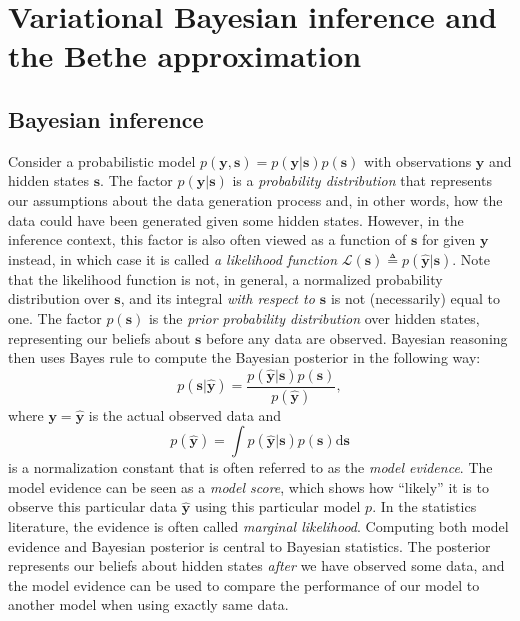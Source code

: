 \section{Variational Bayesian inference and the Bethe approximation}\label{chapter-02:section:bethe-free-energy}

\subsection{Bayesian inference}

Consider a probabilistic model $p(\bm{y}, \bm{s}) =
  p(\bm{y}\vert\bm{s})p(\bm{s})$ with observations $\bm{y}$ and hidden states $\bm{s}$.
The factor $p(\bm{y}\vert\bm{s})$ is a \textit{probability distribution} that represents our assumptions about 
the data generation process and, in other words, how the data could have been generated given some hidden states. However, in the inference context, this factor is also often viewed as a function of $\bm{s}$ for given $\bm{y}$ instead, in which case it is called \textit{a likelihood function} $\mathcal{L}(\bm{s}) \triangleq p(\hat{\bm{y}}|\bm{s})$. 
Note that the likelihood function is not, in general, a normalized probability distribution over $\bm{s}$, and its integral \emph{with respect to $\bm{s}$} is not (necessarily) equal to one.
The factor $p(\bm{s})$ is the \textit{prior probability distribution} over hidden states, representing our beliefs about $\bm{s}$ before any data are observed.
Bayesian reasoning then uses Bayes rule to compute the Bayesian posterior in the following way:
\begin{equation}\label{eq:bfe:bayesposterior}
    p(\bm{s}\vert \hat{\bm{y}}) = \frac{p(\hat{\bm{y}}\vert\bm{s})p(\bm{s})}{p(\hat{\bm{y}})},
\end{equation} where $\bm{y} = \hat{\bm{y}}$ is the actual observed data and 
\begin{equation}\label{eq:bfe:evidence}
    p(\hat{\bm{y}}) = \int p(\hat{\bm{y}}\vert \bm{s})p(\bm{s}) \mathrm{d}\bm{s}
\end{equation}
is a normalization constant that is often referred to as the \textit{model evidence}. 
The model evidence can be seen as a \textit{model score}, which shows how ``likely'' it is to observe this particular data $\hat{\bm{y}}$ using this particular model $p$. In the statistics literature, the evidence is often called \textit{marginal likelihood}.
Computing both model evidence and Bayesian posterior is central to Bayesian statistics.
The posterior represents our beliefs about hidden states \emph{after} we have observed some data, and the model evidence can be used to compare the performance of our model to another model \citep{schonbrodt_sequential_2017, schonbrodt_bayes_2018} when using exactly same data. 
